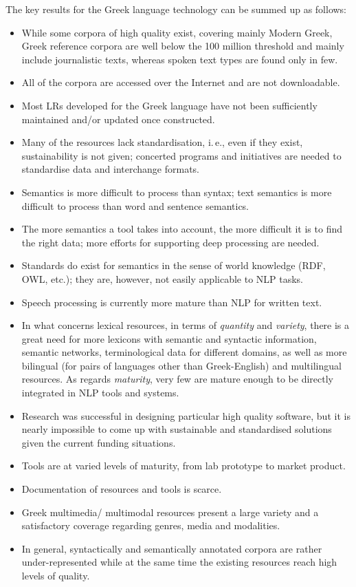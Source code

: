 \begin{multicols}{2}
The key results for the Greek language technology can be summed up as follows:

\begin{itemize}
\item While some corpora of high quality exist, covering mainly Modern Greek, Greek reference corpora are well below the 100 million threshold and mainly include journalistic texts, whereas spoken text types are found only in few. 
\item All of the corpora are accessed over the Internet and are not downloadable. 
\item Most LRs developed for the Greek language have not been sufficiently maintained and/or updated once constructed. 
\item Many of the resources lack standardisation, i.\,e., even if they exist, sustainability is not given; concerted programs and initiatives are needed to standardise data and interchange formats. 
\item Semantics is more difficult to process than syntax; text semantics is more difficult to process than word and sentence semantics.
\item The more semantics a tool takes into account, the more difficult it is to find the right data; more efforts for supporting deep processing are needed.
\item Standards do exist for semantics in the sense of world knowledge (RDF, OWL, etc.); they are, however, not easily applicable to NLP tasks.
\item Speech processing is currently more mature than NLP for written text. 
\item In what concerns lexical resources, in terms of \textit{quantity} and \textit{variety}, there is a great need for more lexicons with semantic and syntactic information, semantic networks, terminological data for different domains, as well as more bilingual (for pairs of languages other than Greek-English) and multilingual resources. As regards \textit{maturity}, very few are mature enough to be directly integrated in NLP tools and systems. 
\item Research was successful in designing particular high quality software, but it is nearly impossible to come up with sustainable and standardised solutions given the current funding situations. 
\item Tools are at varied levels of maturity, from lab prototype to market product. 
\item Documentation of resources and tools is scarce. 
\item Greek multimedia/ multimodal resources present a large variety and a satisfactory coverage regarding genres, media and modalities. 
\item In general, syntactically and semantically annotated corpora are rather under-represented while at the same time the existing resources reach high levels of quality. 
\end{itemize}


\end{multicols}
